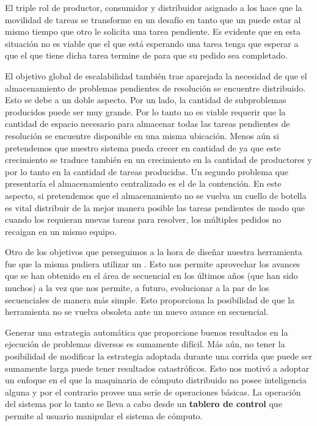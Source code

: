 El triple rol de productor, consumidor y distribuidor asignado a los \ws hace
que la movilidad de tareas se transforme en un desafío en tanto que un \w
puede estar \solveando al mismo tiempo que otro \w le solicita una tarea
pendiente. Es evidente que en esta situación no es viable que el \w que está
esperando una tarea tenga que esperar a que el \w que tiene dicha tarea
termine de \solvear para que su pedido sea completado.

El objetivo global de escalabilidad también trae aparejada la necesidad de que
el almacenamiento de problemas pendientes de resolución se encuentre
distribuido. Esto se debe a un doble aspecto. Por un lado, la cantidad de
subproblemas producidos puede ser muy grande. Por lo tanto no es viable
requerir que la cantidad de espacio necesario para almacenar todas las tareas
pendientes de resolución se encuentre disponible en una misma ubicación. Menos aún
si pretendemos que nuestro sistema pueda crecer en cantidad de \ws ya que este
crecimiento se traduce también en un crecimiento en la cantidad de productores
y por lo tanto en la cantidad de tareas producidas. Un segundo problema que
presentaría el almacenamiento centralizado es el de la contención. En este
aspecto, si pretendemos que el almacenamiento no se vuelva un cuello de
botella es vital distribuir de la mejor manera posible las tareas pendientes
de modo que cuando los \ws requieran nuevas tareas para resolver, los
múltiples pedidos no recaigan en un mismo equipo.


Otro de los objetivos que perseguimos a la hora de diseñar nuestra herramienta
fue que la misma pudiera utilizar un \ssolver \ots. Esto nos permite
aprovechar los avances que se han obtenido en el área de \ssolving secuencial
en los últimos años (que han sido muchos) a la vez que nos permite, a futuro,
evolucionar a la par de los \ssolvers secuenciales de manera más simple. Esto
proporciona la posibilidad de que la herramienta no se vuelva obsoleta ante un
nuevo avance en \ssolving secuencial.

Generar una estrategia automática que proporcione buenos resultados en la
ejecución de problemas diversos es sumamente difícil. Más aún, no tener la
posibilidad de modificar la estrategia adoptada durante una corrida que puede
ser sumamente larga puede tener resultados catastróficos. Esto nos motivó a
adoptar un enfoque en el que la maquinaria de cómputo distribuido no posee
inteligencia alguna y por el contrario provee una serie de operaciones
básicas. La operación del sistema por lo tanto se lleva a cabo desde un
\textbf{tablero de control} que permite al usuario manipular el sistema de
cómputo.


